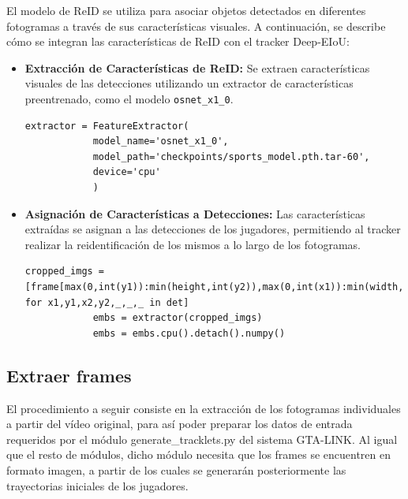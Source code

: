\documentclass[12pt, a4paper, twoside]{article}
\begin{document}
	El modelo de ReID se utiliza para asociar objetos detectados en diferentes fotogramas a través de sus características visuales. A continuación, se describe cómo se integran las características de ReID con el tracker Deep-EIoU:
	
	\begin{itemize}
		\item \textbf{Extracción de Características de ReID:}  
		Se extraen características visuales de las detecciones utilizando un extractor de características preentrenado, como el modelo \texttt{osnet\_x1\_0}.
		\vspace{0.5cm}
		\begin{lstlisting}[style=pythonstyle]
			extractor = FeatureExtractor(
			model_name='osnet_x1_0',
			model_path='checkpoints/sports_model.pth.tar-60',
			device='cpu'
			)
		\end{lstlisting}
		\vspace{0.5cm}
		\item \textbf{Asignación de Características a Detecciones:}  
		Las características extraídas se asignan a las detecciones de los jugadores, permitiendo al tracker realizar la reidentificación de los mismos a lo largo de los fotogramas.
		\vspace{0.5cm}
		\begin{lstlisting}[style=pythonstyle]
			cropped_imgs = [frame[max(0,int(y1)):min(height,int(y2)),max(0,int(x1)):min(width,int(x2))] for x1,y1,x2,y2,_,_,_ in det]
			embs = extractor(cropped_imgs)
			embs = embs.cpu().detach().numpy()
		\end{lstlisting}
	\end{itemize}
	
	\subsection{Extraer frames}
	El procedimiento a seguir consiste en la extracción de los fotogramas individuales a partir del vídeo original, para así poder preparar los datos de entrada requeridos por el módulo generate\_tracklets.py del sistema GTA-LINK. Al igual que el resto de módulos, dicho módulo necesita que los frames se encuentren en formato imagen, a partir de los cuales se generarán posteriormente las trayectorias iniciales de los jugadores.
	
\end{document}
